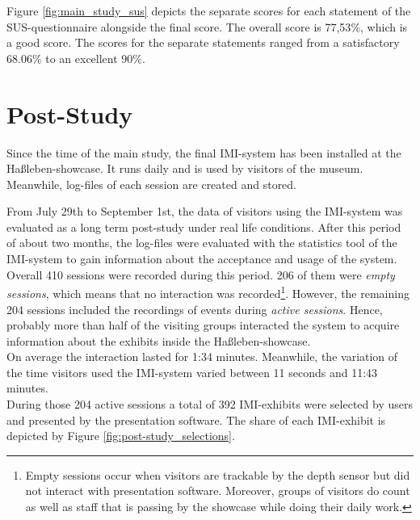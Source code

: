 Figure \ref{fig:main_study_sus} depicts the separate scores for each statement of the \ac{SUS}-questionnaire alongside the final score. The overall score is 77,53$\%$, which is a good score. The scores for the separate statements ranged from a satisfactory 68.06$\%$ to an excellent 90$\%$.


\section{Post-Study}
\label{evaluation_post}

Since the time of the main study, the final \ac{IMI}-system has been installed at the Haßleben-showcase. It runs daily and is used by visitors of the museum. Meanwhile, log-files of each session are created and stored.

From July 29th to September 1st, the data of visitors using the \ac{IMI}-system was evaluated as a long term post-study under real life conditions. After this period of about two months, the log-files were evaluated with the statistics tool of the \ac{IMI}-system to gain information about the acceptance and usage of the system.
\\
Overall 410 sessions were recorded during this period. 206 of them were \textit{empty sessions}, which means that no interaction was recorded\footnote{Empty sessions occur when visitors are trackable by the depth sensor but did not interact with presentation software. Moreover, groups of visitors do count as well as staff that is passing by the showcase while doing their daily work.}. However, the remaining 204 sessions included the recordings of events during \textit{active sessions}. Hence, probably more than half of the visiting groups interacted the system to acquire information about the exhibits inside the Haßleben-showcase.
\\
On average the interaction lasted for 1:34 minutes. Meanwhile, the variation of the time visitors used the \ac{IMI}-system varied between 11 seconds and 11:43 minutes.
\\
During those 204 active sessions a total of 392 \ac{IMI}-exhibits were selected by users and presented by the presentation software. The share of each \ac{IMI}-exhibit is depicted by Figure \ref{fig:post-study_selections}. 

